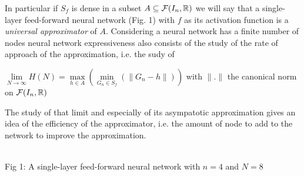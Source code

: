 \documentclass[12pt]{article}
\def\layersep{2.5cm}
\begin{document}
In particular if $S_f$ is dense in a subset $A \subseteq \mathcal{F}(I_n, \mathbb{R})$ we will say that a single-layer feed-forward neural network (Fig. 1) with $f$ as its activation function is a \textit{universal approximator} of $A$. Considering a neural network has a finite number of nodes neural network expressiveness also consists of the study of the rate of approach of the approximation, i.e. the sudy of \\

\begin{center}
  $\lim\limits_{N \to \infty} H(N) = \max\limits_{h\in A} (\min\limits_{G_n \in S_f} (\parallel G_n - h \parallel))$ with $\parallel . \parallel$ the canonical norm on $\mathcal{F}(I_n, \mathbb{R})$
\end{center}

The study of that limit and especially of its asympatotic approximation gives an idea of the efficiency of the approximator, i.e. the amount of node to add to the network to improve the approximation.\\

\begin{center}
  \\
Fig 1: A single-layer feed-forward neural network with $n=4$ and $N=8$
\end{center}
\end{document}
